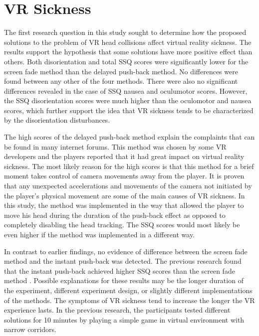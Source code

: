\section{VR Sickness}

The first research question in this study sought to determine how the proposed solutions to the problem of VR head collisions affect virtual reality sickness. The results support the hypothesis that some solutions have more positive effect than others. Both disorientation and total SSQ scores were significantly lower for the screen fade method than the delayed push-back method. No differences were found between any other of the four methods. There were also no significant differences revealed in the case of SSQ nausea and oculumotor scores. However, the SSQ disorientation scores were much higher than the oculomotor and nausea scores, which further support the idea that VR sickness tends to be characterized by the disorientation disturbances. 

The high scores of the delayed push-back method explain the complaints that can be found in many internet forums. This method was chosen by some VR developers and the players reported that it had great impact on virtual reality sickness. The most likely reason for the high scores is that this method for a brief moment takes control of camera movements away from the player. It is proven that any unexpected accelerations and movements of the camera not initiated by the player's physical movement are some of the main causes of VR sickness. In this study, the method was implemented in the way that allowed the player to move his head during the duration of the push-back effect as opposed to completely disabling the head tracking. The SSQ scores would most likely be even higher if the method was implemented in a different way.

In contrast to earlier findings, no evidence of difference between the screen fade method and the instant push-back was detected. The previous research found that the instant push-back achieved higher SSQ scores than the screen fade method \cite{COMPARISONCOLLISION}. Possible explanations for these results may be the longer duration of the experiment, different experiment design, or slightly different implementations of the methods. The symptoms of VR sickness tend to increase the longer the VR experience lasts. In the previous research, the participants tested different solutions for 10 minutes by playing a simple game in virtual environment with narrow corridors.

